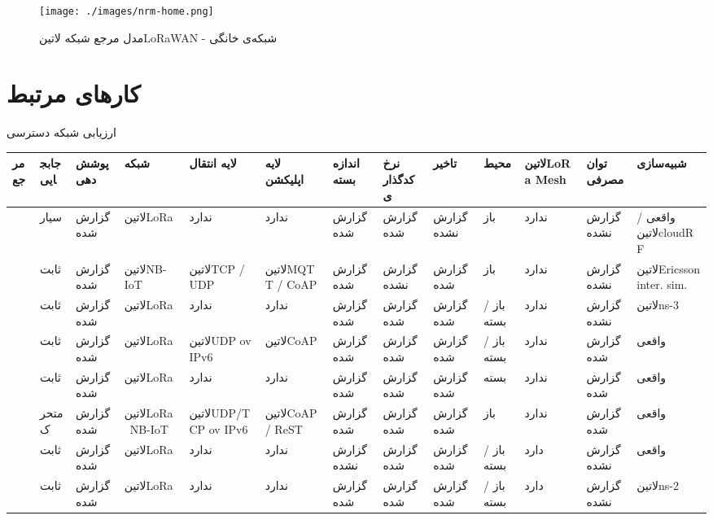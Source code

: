 \documentclass[dvipsnames]{beamer}
\begin{document}
\begin{persian}
	\begin{frame}
		\begin{figure}
		\texttt{[image: ./images/nrm-home.png]}
		\centering
		\caption{مدل مرجع شبکه ‌لاتین{LoRaWAN} - شبکه‌ی خانگی}
		\end{figure}
	\end{frame}

	\section{کارهای مرتبط}

	\begin{frame}{ارزیابی شبکه دسترسی}
		\fontsize{5pt}{6pt}\selectfont
		\begin{tabularx}{\textwidth}{|*{13}{X|}}
			\toprule
			مرجع &
			جابجایی &
			پوشش‌دهی &
			شبکه &
			لایه انتقال &
			لایه اپلیکشن &
			اندازه بسته &
			نرخ کدگذاری &
			تاخیر &
			محیط &
			‌لاتین{LoRa Mesh} &
			توان مصرفی &
			شبیه‌سازی \\
			\midrule
			\cite{sensors-18-00772-v3} &
			سیار &
			گزارش شده &
			‌لاتین{LoRa} &
			ندارد &
			ندارد &
			گزارش شده &
			گزارش شده &
			گزارش نشده &
			باز &
			ندارد &
			گزارش نشده &
			واقعی / ‌لاتین{cloudRF} \\
			\midrule
			\cite{sensors-19-00007} &
			ثابت &
			گزارش شده &
			‌لاتین{NB-IoT} &
			‌لاتین{TCP / UDP} &
			‌لاتین{MQTT / CoAP} &
			گزارش شده &
			گزارش نشده &
			گزارش شده &
			باز &
			ندارد &
			گزارش نشده &
			‌لاتین{Ericsson inter. sim.} \\
			\midrule
			\cite{sensors-20-03061-v2} &
			ثابت &
			گزارش شده &
			‌لاتین{LoRa} &
			ندارد &
			ندارد &
			گزارش شده &
			گزارش شده &
			گزارش شده &
			باز / بسته &
			ندارد &
			گزارش نشده &
			‌لاتین{ns-3} \\
			\midrule
			\cite{sensors-20-00280-v2} &
			ثابت &
			گزارش شده &
			‌لاتین{LoRa} &
			‌لاتین{UDP ov IPv6} &
			‌لاتین{CoAP} &
			گزارش شده &
			گزارش شده &
			گزارش شده &
			باز / بسته &
			ندارد &
			گزارش شده &
			واقعی \\
			\midrule
			\cite{sensors-20-06721} &
			ثابت &
			گزارش شده &
			‌لاتین{LoRa} &
			ندارد &
			ندارد &
			گزارش شده &
			گزارش شده &
			گزارش شده &
			بسته &
			ندارد &
			گزارش شده &
			واقعی \\
			\midrule
			\cite{SanchezIborra2020} &
			متحرک &
			گزارش شده &
			‌لاتین{LoRa \ NB-IoT} &
			‌لاتین{UDP/TCP ov IPv6} &
			‌لاتین{CoAP / ReST} &
			گزارش شده &
			گزارش شده &
			گزارش شده &
			باز &
			ندارد &
			گزارش شده &
			واقعی \\
			\midrule
			\cite{Lee2018} &
			ثابت &
			گزارش شده &
			‌لاتین{LoRa} &
			ندارد &
			ندارد &
			گزارش نشده &
			گزارش شده &
			گزارش شده &
			باز / بسته &
			دارد &
			گزارش نشده &
			واقعی \\
			\midrule
			\cite{Marahatta2021} &
			ثابت &
			گزارش شده &
			‌لاتین{LoRa} &
			ندارد &
			ندارد &
			گزارش شده &
			گزارش شده &
			گزارش شده &
			باز / بسته &
			دارد &
			گزارش نشده &
			‌لاتین{ns-2} \\
			\bottomrule
		\end{tabularx}
	\end{frame}


\end{persian}
\end{document}
